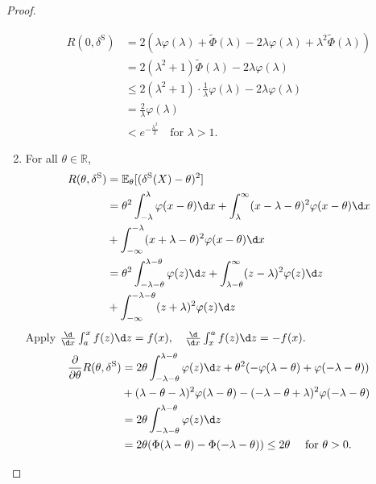 \documentclass[a4paper]{article}
\begin{document}
\begin{proof}
\begin{enumerate}
\begin{equation}
			\begin{aligned}
				R(0,\delta^{\text{S}}) &= 2(\lambda \varphi(\lambda) + \tilde{\Phi}(\lambda) -2 \lambda \varphi(\lambda) + \lambda^2 \tilde{\Phi}(\lambda)) \\
				&= 2(\lambda^2 + 1)\tilde{\Phi}(\lambda) - 2\lambda\varphi(\lambda) \\
				&\leq 2(\lambda^2 + 1) \cdot \frac{1}{\lambda} \varphi(\lambda) - 2\lambda \varphi(\lambda) \\
				&= \frac{2}{\lambda} \varphi(\lambda) \\
				&< e^{-\frac{\lambda^2}{2}} \quad \text{for } \lambda > 1.
			\end{aligned}
		\end{equation}
		\item For all $\theta \in \mathbb{R}$,
		\begin{equation*}
			\begin{aligned}
				R(\theta,\delta^{\text{S}}) &= \mathbb{E}_\theta[(\delta^{\text{S}}(X) - \theta)^2] \\
				&= \theta^2 \int_{-\lambda}^{\lambda} \varphi(x-\theta) \d x + \int_{\lambda}^{\infty} (x-\lambda - \theta)^2 \varphi(x-\theta) \d x \\
				&+ \int_{-\infty}^{-\lambda} (x+\lambda - \theta)^2 \varphi(x-\theta) \d x \\
				&= \theta^2 \int_{-\lambda - \theta}^{\lambda - \theta} \varphi(z) \d z + \int_{\lambda - \theta}^{\infty} (z-\lambda)^2 \varphi(z) \d z \\
				&+ \int_{-\infty}^{-\lambda-\theta} (z+\lambda)^2 \varphi(z) \d z \\
			\end{aligned}
		\end{equation*}
		Apply $\frac{\d}{\d x} \int_a^x f(z) \d z = f(x), \quad \frac{\d}{\d x} \int_x^a f(z) \d z = -f(x).$
		\begin{equation*}
			\begin{aligned}
				\frac{\partial}{\partial \theta} R(\theta,\delta^{\text{S}}) &= 2\theta \int_{-\lambda - \theta}^{\lambda - \theta} \varphi(z) \d z + \theta^2 (-\varphi(\lambda - \theta) + \varphi(-\lambda-\theta)) \\
				&+ (\lambda - \theta - \lambda)^2 \varphi(\lambda - \theta) - (-\lambda -\theta + \lambda)^2 \varphi(-\lambda-\theta) \\
				&= 2\theta \int_{-\lambda - \theta}^{\lambda - \theta} \varphi(z) \d z \\
				&= 2\theta (\Phi(\lambda - \theta) - \Phi(-\lambda - \theta)) \leq 2\theta \quad \text{ for } \theta > 0.

\end{aligned}
\end{equation*}
\end{enumerate}
\end{proof}
\end{document}
